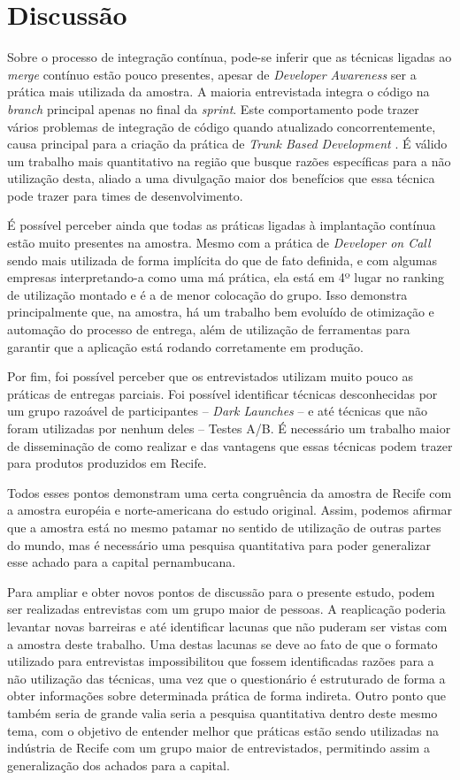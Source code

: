 
\section{Discussão}

Sobre o processo de integração contínua, pode-se inferir que as técnicas ligadas ao \emph{merge} contínuo estão pouco presentes, apesar de \emph{Developer Awareness} ser a prática mais utilizada da amostra. A maioria entrevistada integra o código na \emph{branch} principal apenas no final da \emph{sprint}. Este comportamento pode trazer vários problemas de integração de código quando atualizado concorrentemente, causa principal para a criação da prática de \emph{Trunk Based Development} \cite{devAndDeploymentFB}. É válido um trabalho mais quantitativo na região que busque razões específicas para a não utilização desta, aliado a uma divulgação maior dos benefícios que essa técnica pode trazer para times de desenvolvimento. 

É possível perceber ainda que todas as práticas ligadas à implantação contínua estão muito presentes na amostra. Mesmo com a prática de \emph{Developer on Call} sendo mais utilizada de forma implícita do que de fato definida, e com algumas empresas interpretando-a como uma má prática, ela está em 4º lugar no ranking de utilização montado e é a de menor colocação do grupo. Isso demonstra principalmente que, na amostra, há um trabalho bem evoluído de otimização e automação do processo de entrega, além de utilização de ferramentas para garantir que a aplicação está rodando corretamente em produção.

Por fim, foi possível perceber que os entrevistados utilizam muito pouco as práticas de entregas parciais. Foi possível identificar técnicas desconhecidas por um grupo razoável de participantes -- \emph{Dark Launches} -- e até técnicas que não foram utilizadas por nenhum deles -- Testes A/B. É necessário um trabalho maior de disseminação de como realizar e das vantagens que essas técnicas podem trazer para produtos produzidos em Recife.

Todos esses pontos demonstram uma certa congruência da amostra de Recife com a amostra européia e norte-americana do estudo original. Assim, podemos afirmar que a amostra está no mesmo patamar no sentido de utilização de outras partes do mundo, mas é necessário uma pesquisa quantitativa para poder generalizar esse achado para a capital pernambucana. 

Para ampliar e obter novos pontos de discussão para o presente estudo, podem ser realizadas entrevistas com um grupo maior de pessoas. A reaplicação poderia levantar novas barreiras e até identificar lacunas que não puderam ser vistas com a amostra deste trabalho. Uma destas lacunas se deve ao fato de que o formato utilizado para entrevistas impossibilitou que fossem identificadas razões para a não utilização das técnicas, uma vez que o questionário é estruturado de forma a obter informações sobre determinada prática de forma indireta. Outro ponto que também seria de grande valia seria a pesquisa quantitativa dentro deste mesmo tema, com o objetivo de entender melhor que práticas estão sendo utilizadas na indústria de Recife com um grupo maior de entrevistados, permitindo assim a generalização dos achados para a capital. 
